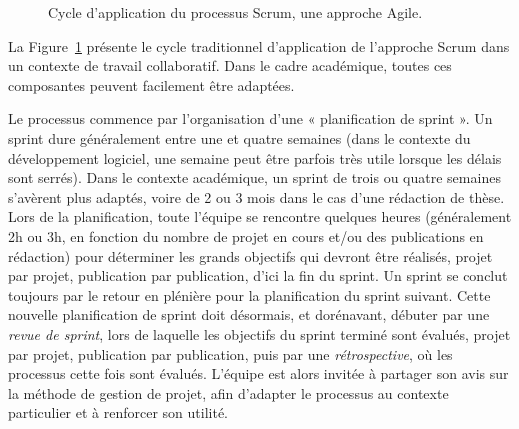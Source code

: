 \documentclass[
  letterpaper,
  DIV=11,
  numbers=noendperiod]{scrreprt}
\begin{document}
\begin{figure}


\caption{\label{fig-scrum}Cycle d'application du processus Scrum, une
approche Agile.}

\end{figure}%

La Figure~\ref{fig-scrum} présente le cycle traditionnel d'application
de l'approche Scrum dans un contexte de travail collaboratif. Dans le
cadre académique, toutes ces composantes peuvent facilement être
adaptées.

Le processus commence par l'organisation d'une « planification de sprint
». Un sprint dure généralement entre une et quatre semaines (dans le
contexte du développement logiciel, une semaine peut être parfois très
utile lorsque les délais sont serrés). Dans le contexte académique, un
sprint de trois ou quatre semaines s'avèrent plus adaptés, voire de 2 ou
3 mois dans le cas d'une rédaction de thèse. Lors de la planification,
toute l'équipe se rencontre quelques heures (généralement 2h ou 3h, en
fonction du nombre de projet en cours et/ou des publications en
rédaction) pour déterminer les grands objectifs qui devront être
réalisés, projet par projet, publication par publication, d'ici la fin
du sprint. Un sprint se conclut toujours par le retour en plénière pour
la planification du sprint suivant. Cette nouvelle planification de
sprint doit désormais, et dorénavant, débuter par une \emph{revue de
sprint}, lors de laquelle les objectifs du sprint terminé sont évalués,
projet par projet, publication par publication, puis par une
\emph{rétrospective}, où les processus cette fois sont évalués. L'équipe
est alors invitée à partager son avis sur la méthode de gestion de
projet, afin d'adapter le processus au contexte particulier et à
renforcer son utilité.
\end{document}
